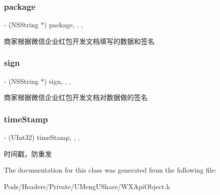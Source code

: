 \subsubsection{\texorpdfstring{package}{package}}
{\footnotesize\ttfamily -\/ (N\+S\+String $\ast$) package\hspace{0.3cm}{\ttfamily [read]}, {\ttfamily [write]}, {\ttfamily [nonatomic]}, {\ttfamily [retain]}}

商家根据微信企业红包开发文档填写的数据和签名 \mbox{\label{interface_h_b_req_aa7fe9c560352d6419a38005069e1a404}} 
\subsubsection{\texorpdfstring{sign}{sign}}
{\footnotesize\ttfamily -\/ (N\+S\+String $\ast$) sign\hspace{0.3cm}{\ttfamily [read]}, {\ttfamily [write]}, {\ttfamily [nonatomic]}, {\ttfamily [retain]}}

商家根据微信企业红包开发文档对数据做的签名 \mbox{\label{interface_h_b_req_aafcc0456aab227fa1b3e379a1419c878}} 
\subsubsection{\texorpdfstring{time\+Stamp}{timeStamp}}
{\footnotesize\ttfamily -\/ (U\+Int32) time\+Stamp\hspace{0.3cm}{\ttfamily [read]}, {\ttfamily [write]}, {\ttfamily [nonatomic]}, {\ttfamily [assign]}}

时间戳，防重发 

The documentation for this class was generated from the following file\+:\begin{DoxyCompactItemize}
\item 
Pods/\+Headers/\+Private/\+U\+Meng\+U\+Share/W\+X\+Api\+Object.\+h\end{DoxyCompactItemize}
